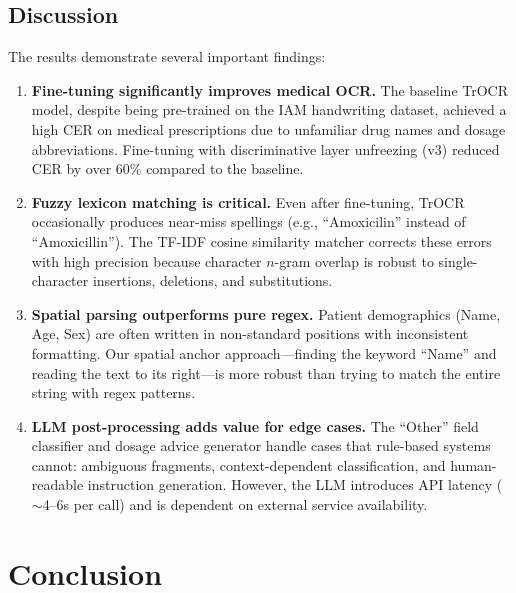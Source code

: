 \documentclass[12pt,a4paper,oneside]{report}
\begin{document}

\section{Discussion}

The results demonstrate several important findings:

\begin{enumerate}
  \item \textbf{Fine-tuning significantly improves medical OCR.} The baseline TrOCR model, despite being pre-trained on the IAM handwriting dataset, achieved a high CER on medical prescriptions due to unfamiliar drug names and dosage abbreviations. Fine-tuning with discriminative layer unfreezing (v3) reduced CER by over 60\% compared to the baseline.

  \item \textbf{Fuzzy lexicon matching is critical.} Even after fine-tuning, TrOCR occasionally produces near-miss spellings (e.g., ``Amoxicilin'' instead of ``Amoxicillin''). The TF-IDF cosine similarity matcher corrects these errors with high precision because character $n$-gram overlap is robust to single-character insertions, deletions, and substitutions.

  \item \textbf{Spatial parsing outperforms pure regex.} Patient demographics (Name, Age, Sex) are often written in non-standard positions with inconsistent formatting. Our spatial anchor approach---finding the keyword ``Name'' and reading the text to its right---is more robust than trying to match the entire string with regex patterns.

  \item \textbf{LLM post-processing adds value for edge cases.} The ``Other'' field classifier and dosage advice generator handle cases that rule-based systems cannot: ambiguous fragments, context-dependent classification, and human-readable instruction generation. However, the LLM introduces API latency ($\sim$4--6s per call) and is dependent on external service availability.
\end{enumerate}


\chapter{Conclusion}
\end{document}
